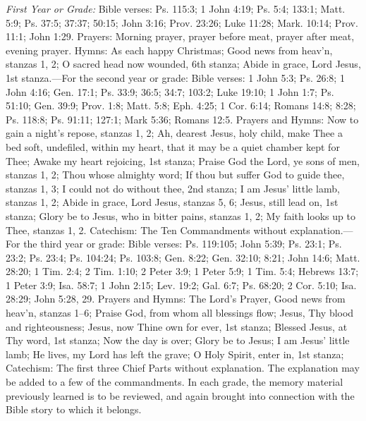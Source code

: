 \emph{First Year or Grade:} Bible verses: Ps. 115:3; 1 John 4:19; Ps. 5:4; 133:1; Matt. 5:9; Ps. 37:5; 37:37; 50:15; John 3:16; Prov. 23:26; Luke 11:28; Mark. 10:14; Prov. 11:1; John 1:29. Prayers: Morning prayer, prayer before meat, prayer after meat, evening prayer. Hymns: As each happy Christmas; Good news from heav’n, stanzas 1, 2; O sacred head now wounded, 6th stanza; Abide in grace, Lord Jesus, 1st stanza.—For the second year or grade: Bible verses: 1 John 5:3; Ps. 26:8; 1 John 4:16; Gen. 17:1; Ps. 33:9; 36:5; 34:7; 103:2; Luke 19:10; 1 John 1:7; Ps. 51:10; Gen. 39:9; Prov. 1:8; Matt. 5:8; Eph. 4:25; 1 Cor. 6:14; Romans 14:8; 8:28; Ps. 118:8; Ps. 91:11; 127:1; Mark 5:36; Romans 12:5. Prayers and Hymns: Now to gain a night’s repose, stanzas 1, 2; Ah, dearest Jesus, holy child, make Thee a bed soft, undefiled, within my heart, that it may be a quiet chamber kept for Thee; Awake my heart rejoicing, 1st stanza; Praise God the Lord, ye sons of men, stanzas 1, 2; Thou whose almighty word; If thou but suffer God to guide thee, stanzas 1, 3; I could not do without thee, 2nd stanza; I am Jesus’ little lamb, stanzas 1, 2; Abide in grace, Lord Jesus, stanzas 5, 6; Jesus, still lead on, 1st stanza; Glory be to Jesus, who in bitter pains, stanzas 1, 2; My faith looks up to Thee, stanzas 1, 2. Catechism: The Ten Commandments without explanation.—For the third year or grade: Bible verses: Ps. 119:105; John 5:39; Ps. 23:1; Ps. 23:2; Ps. 23:4; Ps. 104:24; Ps. 103:8; Gen. 8:22; Gen. 32:10; 8:21; John 14:6; Matt. 28:20; 1 Tim. 2:4; 2 Tim. 1:10; 2 Peter 3:9; 1 Peter 5:9; 1 Tim. 5:4; Hebrews 13:7; 1 Peter 3:9; Isa. 58:7; 1 John 2:15; Lev. 19:2; Gal. 6:7; Ps. 68:20; 2 Cor. 5:10; Isa. 28:29; John 5:28, 29. Prayers and Hymns: The Lord’s Prayer, Good news from heav’n, stanzas 1–6; Praise God, from whom all blessings flow; Jesus, Thy blood and righteousness; Jesus, now Thine own for ever, 1st stanza; Blessed Jesus, at Thy word, 1st stanza; Now the day is over; Glory be to Jesus; I am Jesus’ little lamb; He lives, my Lord has left the grave; O Holy Spirit, enter in, 1st stanza; Catechism: The first three Chief Parts without explanation. The explanation may be added to a few of the commandments. In each grade, the memory material previously learned is to be reviewed, and again brought into connection with the Bible story to which it belongs.

